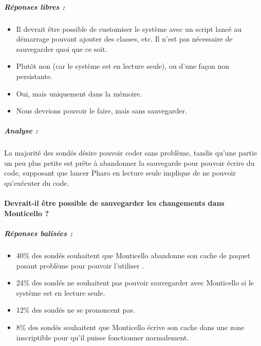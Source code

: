 \subparagraph{Réponses libres :}
\begin{itemize}
	\item Il devrait être possible de customiser le système avec un script lancé au démarrage pouvant ajouter des classes, etc. Il n'est pas nécessaire de sauvegarder quoi que ce soit.
	\item Plutôt non (car le système est en lecture seule), ou d'une façon non persistante.
	\item Oui, mais uniquement dans la mémoire.
	\item Nous devrions pouvoir le faire, mais sans sauvegarder.
\end{itemize}

\subparagraph{Analyse :}
La majorité des sondés désire pouvoir coder sans problème, tandis qu'une partie un peu plus petite est prête à abandonner la sauvegarde pour pouvoir écrire du code, supposant que lancer Pharo en lecture seule implique de ne pouvoir qu'exécuter du code.

\paragraph{Devrait-il être possible de sauvegarder les changements dans Monticello ?}
\subparagraph{Réponses balisées :}
\begin{itemize}
	\item 40\% des sondés souhaitent que Monticello abandonne son cache de paquet posant problème pour pouvoir l'utiliser .
	\item 24\% des sondés ne souhaitent pas pouvoir sauvegarder avec Monticello si le système est en lecture seule.
	\item 12\% des sondés ne se prononcent pas.
	\item 8\% des sondés souhaitent que Monticello écrive son cache dans une zone inscriptible pour qu'il puisse fonctionner normalement.
\end{itemize}


